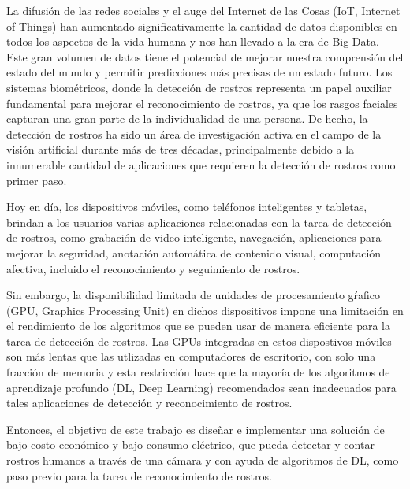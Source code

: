 \documentclass[
11pt, %
]{plan}
\begin{document}
La difusión de las redes sociales y el auge del Internet de las Cosas (IoT, Internet of Things) han aumentado significativamente la cantidad de datos disponibles en todos los aspectos de la vida humana y nos han llevado a la era de Big Data. Este gran volumen de datos tiene el potencial de mejorar nuestra comprensión del estado del mundo y permitir predicciones más precisas de un estado futuro. Los sistemas biométricos, donde la detección de rostros representa un papel auxiliar fundamental para mejorar el reconocimiento de rostros, ya que los rasgos faciales capturan una gran parte de la individualidad de una persona. De hecho, la detección de rostros ha sido un área de investigación activa en el campo de la visión artificial durante más de tres décadas, principalmente debido a la innumerable cantidad de aplicaciones que requieren la detección de rostros como primer paso.

Hoy en día, los dispositivos móviles, como teléfonos inteligentes y tabletas, brindan a los usuarios varias aplicaciones relacionadas con la tarea de detección de rostros, como grabación de video inteligente, navegación, aplicaciones para mejorar la seguridad, anotación automática de contenido visual, computación afectiva, incluido el reconocimiento y seguimiento de rostros.

Sin embargo, la disponibilidad limitada de unidades de procesamiento gŕafico (GPU, Graphics Processing Unit) en dichos dispositivos impone una limitación en el rendimiento de los algoritmos que se pueden usar de manera eficiente para la tarea de detección de rostros. Las GPUs integradas en estos dispostivos móviles son más lentas que las utlizadas en computadores de escritorio, con solo una fracción de memoria y esta restricción hace que la mayoría de los algoritmos de aprendizaje profundo (DL, Deep Learning) recomendados sean inadecuados para tales aplicaciones de detección y reconocimiento de rostros.

Entonces, el objetivo de este trabajo es diseñar e implementar una solución de bajo costo económico y bajo consumo eléctrico, que pueda detectar y contar rostros humanos a través de una cámara y con ayuda de algoritmos de DL, como paso previo para la tarea de reconocimiento de rostros.
\end{document}
